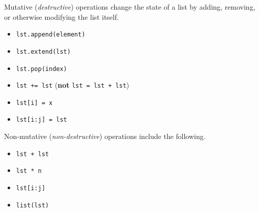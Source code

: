 \begin{blocksection}
Mutative (\emph{destructive}) operations change the state of a list by adding,
removing, or otherwise modifying the list itself.

\begin{itemize}
\item \lstinline$lst.append(element)$
\item \lstinline$lst.extend(lst)$
\item \lstinline$lst.pop(index)$
\item \lstinline$lst += lst$ (\textbf{not} \lstinline$lst = lst + lst$)
\item \lstinline$lst[i] = x$
\item \lstinline$lst[i:j] = lst$
\end{itemize}
\end{blocksection}

\vspace{\parskip}

\begin{blocksection}
Non-mutative (\emph{non-destructive}) operations include the following.

\begin{itemize}
\item \lstinline$lst + lst$
\item \lstinline$lst * n$
\item \lstinline$lst[i:j]$
\item \lstinline$list(lst)$
\end{itemize}
\end{blocksection}

\vspace{\parskip}
